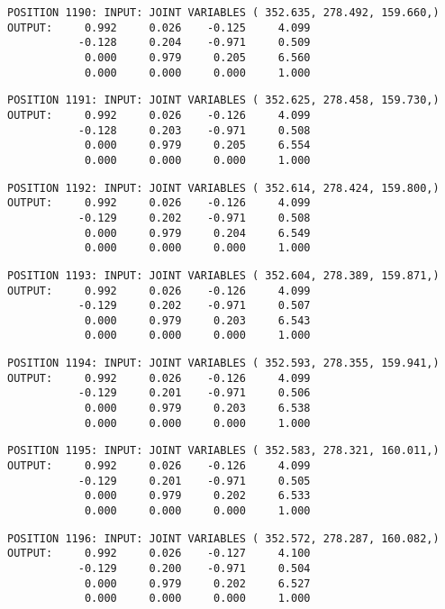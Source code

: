 \begin{verbatim}
POSITION 1190: INPUT: JOINT VARIABLES ( 352.635, 278.492, 159.660,)
OUTPUT:     0.992     0.026    -0.125     4.099
           -0.128     0.204    -0.971     0.509
            0.000     0.979     0.205     6.560
            0.000     0.000     0.000     1.000
\end{verbatim} \pagebreak[1]\begin{verbatim}
POSITION 1191: INPUT: JOINT VARIABLES ( 352.625, 278.458, 159.730,)
OUTPUT:     0.992     0.026    -0.126     4.099
           -0.128     0.203    -0.971     0.508
            0.000     0.979     0.205     6.554
            0.000     0.000     0.000     1.000
\end{verbatim} \pagebreak[1]\begin{verbatim}
POSITION 1192: INPUT: JOINT VARIABLES ( 352.614, 278.424, 159.800,)
OUTPUT:     0.992     0.026    -0.126     4.099
           -0.129     0.202    -0.971     0.508
            0.000     0.979     0.204     6.549
            0.000     0.000     0.000     1.000
\end{verbatim} \pagebreak[1]\begin{verbatim}
POSITION 1193: INPUT: JOINT VARIABLES ( 352.604, 278.389, 159.871,)
OUTPUT:     0.992     0.026    -0.126     4.099
           -0.129     0.202    -0.971     0.507
            0.000     0.979     0.203     6.543
            0.000     0.000     0.000     1.000
\end{verbatim} \pagebreak[1]\begin{verbatim}
POSITION 1194: INPUT: JOINT VARIABLES ( 352.593, 278.355, 159.941,)
OUTPUT:     0.992     0.026    -0.126     4.099
           -0.129     0.201    -0.971     0.506
            0.000     0.979     0.203     6.538
            0.000     0.000     0.000     1.000
\end{verbatim} \pagebreak[1]\begin{verbatim}
POSITION 1195: INPUT: JOINT VARIABLES ( 352.583, 278.321, 160.011,)
OUTPUT:     0.992     0.026    -0.126     4.099
           -0.129     0.201    -0.971     0.505
            0.000     0.979     0.202     6.533
            0.000     0.000     0.000     1.000
\end{verbatim} \pagebreak[1]\begin{verbatim}
POSITION 1196: INPUT: JOINT VARIABLES ( 352.572, 278.287, 160.082,)
OUTPUT:     0.992     0.026    -0.127     4.100
           -0.129     0.200    -0.971     0.504
            0.000     0.979     0.202     6.527
            0.000     0.000     0.000     1.000
\end{verbatim} \pagebreak[1]\begin{verbatim}

\end{verbatim}
